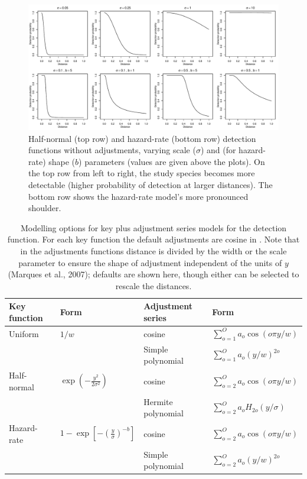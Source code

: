\documentclass[article]{jss}
\begin{document}
\begin{CodeChunk}
\begin{figure}

{\centering \includegraphics{paper_files/figure-latex/hn-hr-par-comp-1} 

}

\caption{Half-normal (top row) and hazard-rate (bottom row) detection functions without adjustments, varying scale ($\sigma$) and (for hazard-rate) shape ($b$) parameters (values are given above the plots). On the top row from left to right, the study species becomes more detectable (higher probability of detection at larger distances). The bottom row shows the hazard-rate model's more pronounced shoulder.\label{fig:hnhr}}\label{fig:hn-hr-par-comp}
\end{figure}
\end{CodeChunk}

\begin{table}
\begin{tabular}{llll}
\hline
Key function   & Form   & Adjustment series & Form\\
\hline
 Uniform  & $1/w$   & cosine  & $\sum_{o=1}^O a_o \cos(o \pi y/w)$ \\
 & & Simple polynomial & $\sum_{o=1}^O a_o (y/w)^{2o}$ \\
 Half-normal  & $\exp\left(-\frac{y^2}{2 \sigma^2}\right)$ & cosine  & $\sum_{o=2}^O a_o \cos(o \pi y/w)$ \\
 & & Hermite polynomial & $\sum_{o=2}^O a_o H_{2o}(y/\sigma)$ \\
 Hazard-rate  & $1-\exp\left[-\left(\frac{y}{\sigma}\right)^{-b}\right]$ & cosine  & $\sum_{o=2}^O a_o \cos(o \pi y/w)$ \\
 & & Simple polynomial & $\sum_{o=2}^O a_o (y/w)^{2o}$ \\
\hline
\end{tabular}
\label{tab:keyadj}
\caption{Modelling options for key plus adjustment series models for the detection function. For each key function the default adjustments are cosine in . Note that in the adjustments functions distance is divided by the width or the scale parameter to ensure the shape of adjustment independent of the units of $y$ (Marques et al., 2007); defaults are shown here, though either can be selected to rescale the distances.}
\end{table}
\end{document}
